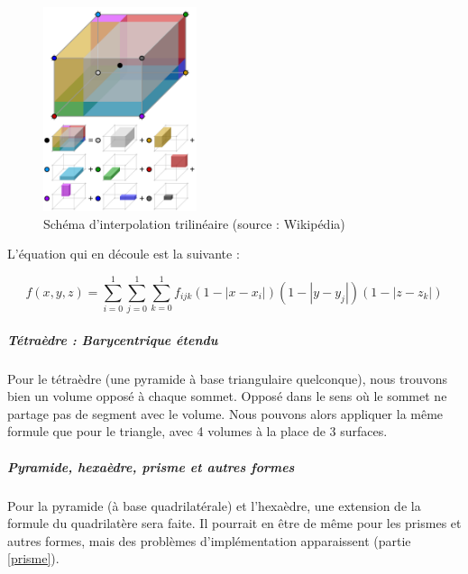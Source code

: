 \begin{figure}[H]
    \centering
    \includegraphics[width=0.4\textwidth]{images/Trilinear_interpolation_visualisation.svg.png}
    \caption{Schéma d'interpolation trilinéaire (source : Wikipédia)} %
    \label{fig:trilineaire}
\end{figure}

L'équation qui en découle est la suivante :

\begin{equation}
    f(x, y, z) = \sum_{i=0}^{1} \sum_{j=0}^{1} \sum_{k=0}^{1} f_{ijk} (1 - |x - x_i|)(1 - |y - y_j|)(1 - |z - z_k|)
\end{equation}



\subparagraph{Tétraèdre : Barycentrique étendu}

Pour le tétraèdre (une pyramide à base triangulaire quelconque), nous trouvons bien un volume opposé à chaque sommet. Opposé dans le sens où le sommet ne partage pas de segment avec le volume. Nous pouvons alors appliquer la même formule que pour le triangle, avec 4 volumes à la place de 3 surfaces.

\subparagraph{Pyramide, hexaèdre, prisme et autres formes}

Pour la pyramide (à base quadrilatérale) et l’hexaèdre, une extension de la formule du quadrilatère sera faite.
Il pourrait en être de même pour les prismes et autres formes, mais des problèmes d'implémentation apparaissent (partie \ref{prisme}).


